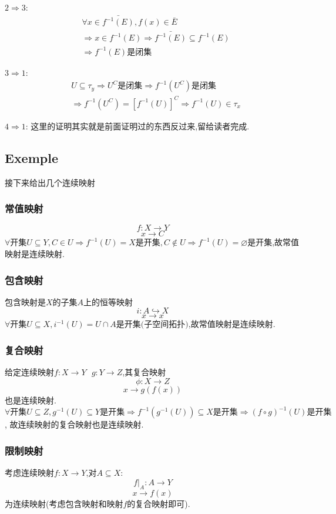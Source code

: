 \documentclass[12pt, a4paper, oneside]{ctexbook}
\begin{document}
  $2\Rightarrow 3$:
  $$
  \begin{aligned}&
    \forall x\in \bar{f^{-1}(E)},f(x)\in \bar{E}\\&
    \Rightarrow x\in f^{-1}(E)\Rightarrow\bar{f^{-1}(E)}\subseteq f^{-1}(E)\\&
    \Rightarrow f^{-1}(E)\text{是闭集}
    \end{aligned}
  $$


  $3\Rightarrow 1$:
  $$
  \begin{aligned}&
    U\subseteq \tau_y\Rightarrow U^C\text{是闭集}\Rightarrow f^{-1}(U^C)\text{是闭集}\\&
    \Rightarrow f^{-1}(U^C)=[f^{-1}(U)]^C\Rightarrow f^{-1}(U)\in\tau_x
    \end{aligned}
  $$


  $4\Rightarrow 1$:
  这里的证明其实就是前面证明过的东西反过来,留给读者完成.
  \subsection{Exemple}
  接下来给出几个连续映射
  \subsubsection{常值映射 }
  $$
    f:X\rightarrow  Y
  $$
  $$
    x\rightarrow C
  $$
  $\forall \text{开集}U\subseteq Y,C\in U\Rightarrow f^{-1}(U)=X \text{是开集}, 
  C\notin U\Rightarrow f^{-1}(U)=\varnothing \text{是开集}$,故常值映射是连续映射.
  \subsubsection{包含映射 }
  包含映射是$X$的子集$A$上的恒等映射
  $$
    i:A\hookrightarrow  X
  $$
  $$
    x\rightarrow x
  $$
  $\forall \text{开集}U\subseteq X,i^{-1}(U)=U\cap A \text{是开集(子空间拓扑)}$,故常值映射是连续映射.
  \subsubsection{复合映射 }
  给定连续映射$f:X\rightarrow  Y\text{    }g:Y\rightarrow  Z$,其复合映射
  $$
    \phi:X\rightarrow Z
  $$
  $$
    x\rightarrow g(f(x))
  $$
  也是连续映射.$\forall \text{开集}U\subseteq Z,g^{-1}(U)\subseteq Y 
  \text{是开集}\Rightarrow f^{-1}(g^{-1}(U))\subseteq X\text{是开集}\Rightarrow (f\circ g)^{-1}(U)\text{是开集}$,
  故连续映射的复合映射也是连续映射.
  \subsubsection{限制映射 }
  考虑连续映射$f:X\rightarrow Y$,对$A\subseteq X:$
  $$
  f|_A:A\rightarrow Y
  $$
  $$
    x\rightarrow f(x)
  $$
  为连续映射(考虑包含映射和映射$f$的复合映射即可).
\end{document}

